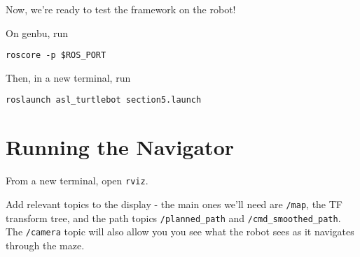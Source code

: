 \documentclass{article}
\begin{document}

Now, we're ready to test the framework on the robot!




On genbu, run

\begin{lstlisting}
roscore -p $ROS_PORT
\end{lstlisting}

Then, in a new terminal, run

\begin{lstlisting}
roslaunch asl_turtlebot section5.launch
\end{lstlisting}


\section{Running the Navigator}

From a new terminal, open \texttt{rviz}. 

Add relevant topics to the display - the main ones we'll need are \texttt{/map}, the TF transform tree, and the path topics \texttt{/planned\_path} and \texttt{/cmd\_smoothed\_path}. The \texttt{/camera} topic will also allow you you see what the robot sees as it navigates through the maze.
\end{document}
